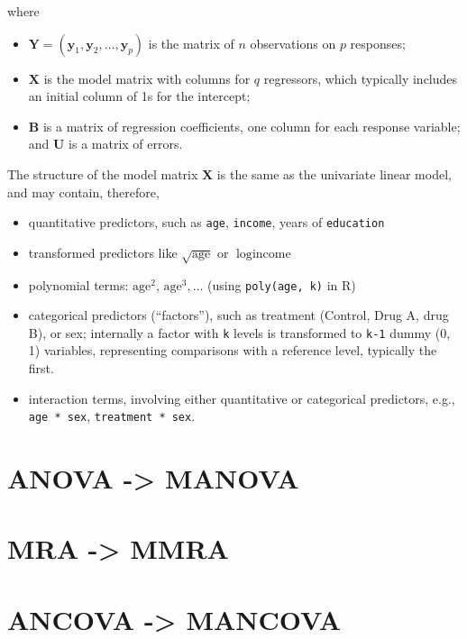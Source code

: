 \documentclass[
  letterpaper,
  10pt,
  krantz2]{krantz}
\providecommand{\tightlist}{%
  \setlength{\itemsep}{0pt}\setlength{\parskip}{0pt}}\usepackage{longtable,booktabs,array}
\begin{document}
where

\begin{itemize}
\tightlist
\item
  \(\mathbf{Y} = (\mathbf{y}_1 , \mathbf{y}_2, \dots , \mathbf{y}_p )\)
  is the matrix of \(n\) observations on \(p\) responses;
\item
  \(\mathbf{X}\) is the model matrix with columns for \(q\) regressors,
  which typically includes an initial column of 1s for the intercept;
\item
  \(\mathbf{B}\) is a matrix of regression coefficients, one column for
  each response variable; and \(\mathbf{U}\) is a matrix of errors.
\end{itemize}

The structure of the model matrix \(\mathbf{X}\) is the same as the
univariate linear model, and may contain, therefore,

\begin{itemize}
\tightlist
\item
  quantitative predictors, such as \texttt{age}, \texttt{income}, years
  of \texttt{education}
\item
  transformed predictors like \(\sqrt{\text{age}}\) or
  \(\log{\text{income}}\)
\item
  polynomial terms: \(\text{age}^2\), \(\text{age}^3, \dots\) (using
  \texttt{poly(age,\ k)} in R)
\item
  categorical predictors (``factors''), such as treatment (Control, Drug
  A, drug B), or sex; internally a factor with \texttt{k} levels is
  transformed to \texttt{k-1} dummy (0, 1) variables, representing
  comparisons with a reference level, typically the first.
\item
  interaction terms, involving either quantitative or categorical
  predictors, e.g., \texttt{age\ *\ sex}, \texttt{treatment\ *\ sex}.
\end{itemize}

\hypertarget{anova---manova}{%
\section{ANOVA -\textgreater{} MANOVA}\label{anova---manova}}

\hypertarget{mra---mmra}{%
\section{MRA -\textgreater{} MMRA}\label{mra---mmra}}

\hypertarget{ancova---mancova}{%
\section{ANCOVA -\textgreater{} MANCOVA}\label{ancova---mancova}}
\end{document}
